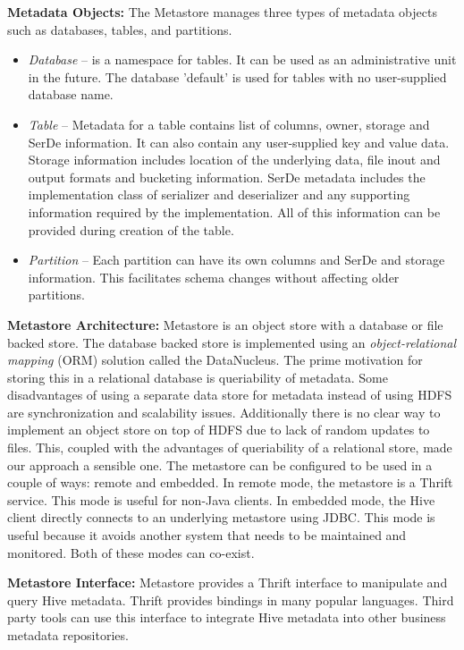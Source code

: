 \documentclass[twocolumn]{article}
\newcommand{\bi}{\begin{itemize}}
\newcommand{\ei}{\end{itemize}}
\newcommand{\ii}{\item}
\begin{document}
\noindent
\textbf{Metadata Objects:}
The Metastore manages three types of metadata objects such as databases, tables, and partitions.
\bi 
\ii \textit{Database} – is a namespace for tables. It can be used as an administrative unit in the future. The database 'default' is used for tables with no user-supplied database name.
\ii \textit{Table} – Metadata for a table contains list of columns, owner, storage and SerDe information. It can also contain any user-supplied key and value data. Storage information includes location of the underlying data, file inout and output formats and bucketing information. SerDe metadata includes the implementation class of serializer and deserializer and any supporting information required by the implementation. All of this information can be provided during creation of the table.
\ii \textit{Partition} – Each partition can have its own columns and SerDe and storage information. This facilitates schema changes without affecting older partitions.
\ei

\noindent
\textbf{Metastore Architecture:} Metastore is an object store with a database or file backed store. The database backed store is implemented using an \textit{object-relational mapping} (ORM) solution called the DataNucleus. The prime motivation for storing this in a relational database is queriability of metadata. Some disadvantages of using a separate data store for metadata instead of using HDFS are synchronization and scalability issues. Additionally there is no clear way to implement an object store on top of HDFS due to lack of random updates to files. This, coupled with the advantages of queriability of a relational store, made our approach a sensible one.
The metastore can be configured to be used in a couple of ways: remote and embedded. In remote mode, the metastore is a Thrift service. This mode is useful for non-Java clients. In embedded mode, the Hive client directly connects to an underlying metastore using JDBC. This mode is useful because it avoids another system that needs to be maintained and monitored. Both of these modes can co-exist.

\noindent
\textbf{Metastore Interface:} Metastore provides a Thrift interface to manipulate and query Hive metadata. Thrift provides bindings in many popular languages. Third party tools can use this interface to integrate Hive metadata into other business metadata repositories.
\end{document}

